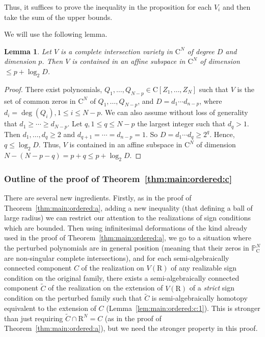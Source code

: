 \documentclass[10pt]{amsart}
\newtheorem{lemma}{Lemma}[section]
\theoremstyle{definition}
\theoremstyle{remark}
\numberwithin{equation}{section}
\newcommand {\R} {\mathrm{R}}
\newcommand {\C}     {\mathrm{C}}
\begin{document}
Thus, it suffices to prove the inequality in the proposition for each $V_i$ and then take the sum of the upper bounds.

We will use the following lemma.

\begin{lemma}
\label{lem:CI}
Let $V$ is a complete intersection variety in $\C^N$ of degree $D$ and dimension $p$. 
Then $V$ is contained in an affine subspace in $\C^N$ of dimension $\leq p + \log_2 D$.
\end{lemma}

\begin{proof}
There exist polynomials,
$Q_1,\ldots,Q_{N-p} \in \C[Z_1,\ldots,Z_N]$ such that $V$ is the set of common zeros in $\C^N$ of $Q_1,\ldots, Q_{N-p}$,
and $D = d_1 \cdots d_{n-p}$, where $d_i = \deg(Q_i), 1 \leq i \leq N-p$. We can also assume without loss of generality that $d_1 \geq \cdots \geq d_{N-p}$. Let $q, 1 \leq q \leq N-p$ the largest integer such that
$d_q > 1$. Then $d_1,\ldots,d_q \geq 2$ and $d_{q+1} = \cdots = d_{n-p} = 1$. 
So $D = d_1 \cdots d_q \geq 2^q$. Hence, $q \leq \log_2 D$.
Thus, $V$ is contained in an affine subspace in $\C^N$ of dimension $N - (N - p - q) = p+q \leq p + \log_2 D$.  
\end{proof}


\subsubsection{Outline of the proof of Theorem~\ref{thm:main:ordered:c}}
 There are several new ingredients. Firstly, as in the proof of Theorem~\ref{thm:main:ordered:a}, adding a new inequality (that defining a ball of large radius) we can restrict our attention to the realizations of sign conditions which are bounded.
 Then using infinitesimal deformations
of the kind already used in the proof of Theorem~\ref{thm:main:ordered:a},
we go to a situation where the perturbed polynomials are in general
position (meaning that their zeros in $\mathbb{P}^N_\C$ are non-singular complete intersections), and for each semi-algebraically connected component $C$ of the realization on $V(\R)$ of any realizable sign condition on the original family, there exists a semi-algebraically connected component $\widetilde{C}$ of the realization on the extension of $V(\R)$ of 
a \emph{strict}  sign condition on the perturbed family such that
$\widetilde{C}$ is semi-algebraically homotopy equivalent to the extension of $C$ (Lemma~\ref{lem:main:ordered:c:1}). This is stronger than just requiring $\widetilde{C} \cap \R^N = C$ (as in the proof of Theorem~\ref{thm:main:ordered:a}), but we need the stronger property in this proof.
\end{document}
